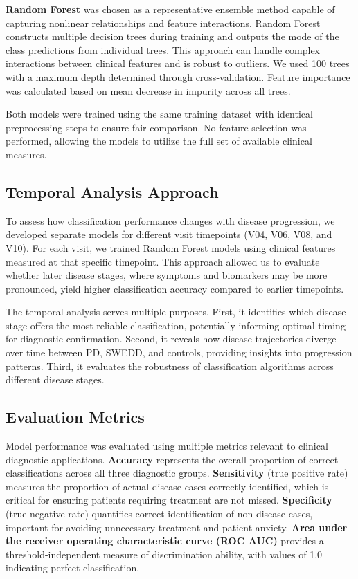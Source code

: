 \documentclass[12pt,a4paper]{article}
\begin{document}
\textbf{Random Forest} was chosen as a representative ensemble method capable of capturing nonlinear relationships and feature interactions. Random Forest constructs multiple decision trees during training and outputs the mode of the class predictions from individual trees. This approach can handle complex interactions between clinical features and is robust to outliers. We used 100 trees with a maximum depth determined through cross-validation. Feature importance was calculated based on mean decrease in impurity across all trees.

Both models were trained using the same training dataset with identical preprocessing steps to ensure fair comparison. No feature selection was performed, allowing the models to utilize the full set of available clinical measures.

\subsection{Temporal Analysis Approach}

To assess how classification performance changes with disease progression, we developed separate models for different visit timepoints (V04, V06, V08, and V10). For each visit, we trained Random Forest models using clinical features measured at that specific timepoint. This approach allowed us to evaluate whether later disease stages, where symptoms and biomarkers may be more pronounced, yield higher classification accuracy compared to earlier timepoints.

The temporal analysis serves multiple purposes. First, it identifies which disease stage offers the most reliable classification, potentially informing optimal timing for diagnostic confirmation. Second, it reveals how disease trajectories diverge over time between PD, SWEDD, and controls, providing insights into progression patterns. Third, it evaluates the robustness of classification algorithms across different disease stages.

\subsection{Evaluation Metrics}

Model performance was evaluated using multiple metrics relevant to clinical diagnostic applications. \textbf{Accuracy} represents the overall proportion of correct classifications across all three diagnostic groups. \textbf{Sensitivity} (true positive rate) measures the proportion of actual disease cases correctly identified, which is critical for ensuring patients requiring treatment are not missed. \textbf{Specificity} (true negative rate) quantifies correct identification of non-disease cases, important for avoiding unnecessary treatment and patient anxiety. \textbf{Area under the receiver operating characteristic curve (ROC AUC)} provides a threshold-independent measure of discrimination ability, with values of 1.0 indicating perfect classification.
\end{document}
